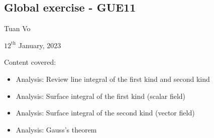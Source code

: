\documentclass[12pt]{article}
\begin{document}
\begin{center}
	\section*{Global exercise - GUE11}
\end{center}
\begin{center}
	Tuan Vo
\end{center}
\begin{center}
	$12^{\text{th}}$ January, 2023
\end{center}
Content covered:
\begin{itemize}
	\item[\checkmark] Analysis: Review line integral of the first kind and second kind 
	\item[\checkmark] Analysis: Surface integral of the first kind (scalar field)
	\item[\checkmark] Analysis: Surface integral of the second kind (vector field)
	\item[\checkmark] Analysis: Gauss's theorem
\end{itemize}
\end{document}
